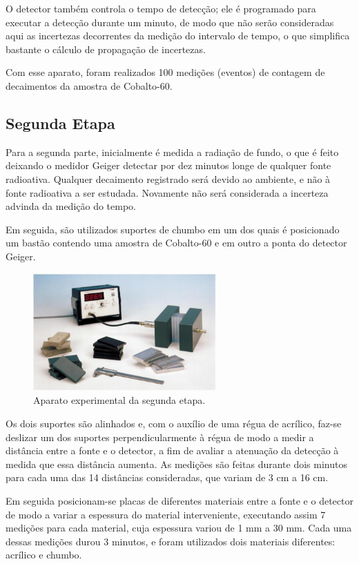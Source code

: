 \documentclass{article}
\begin{document}
O detector também controla o tempo de detecção; ele é programado para executar a detecção durante um minuto, de modo que não serão consideradas aqui as incertezas decorrentes da medição do intervalo de tempo, o que simplifica bastante o cálculo de propagação de incertezas.

Com esse aparato, foram realizados 100 medições (eventos) de contagem de decaimentos da amostra de Cobalto-60.

\subsection{Segunda Etapa}

Para a segunda parte, inicialmente é medida a radiação de fundo, o que é feito deixando o medidor Geiger detectar por dez minutos longe de qualquer fonte radioativa. Qualquer decaimento registrado será devido ao ambiente, e não à fonte radioativa a ser estudada. Novamente não será considerada a incerteza advinda da medição do tempo.

Em seguida, são utilizados suportes de chumbo em um dos quais é posicionado um bastão contendo uma amostra de Cobalto-60 e em outro a ponta do detector Geiger.

\newpage

\begin{figure}
    \centering
    \includegraphics[width=7cm]{2etapa.png}
    \caption{Aparato experimental da segunda etapa.}
    \label{2etapa}
\end{figure}

Os dois suportes são alinhados e, com o auxílio de uma régua de acrílico, faz-se deslizar um dos suportes perpendicularmente à régua de modo a medir a distância entre a fonte e o detector, a fim de avaliar a atenuação da detecção à medida que essa distância aumenta. As medições são feitas durante dois minutos para cada uma das 14 distâncias consideradas, que variam de 3 cm a 16 cm.

Em seguida posicionam-se placas de diferentes materiais entre a fonte e o detector de modo a variar a espessura do material interveniente, executando assim 7 medições para cada material, cuja espessura variou de 1 mm a 30 mm. Cada uma dessas medições durou 3 minutos, e foram utilizados dois materiais diferentes: acrílico e chumbo.
\end{document}

